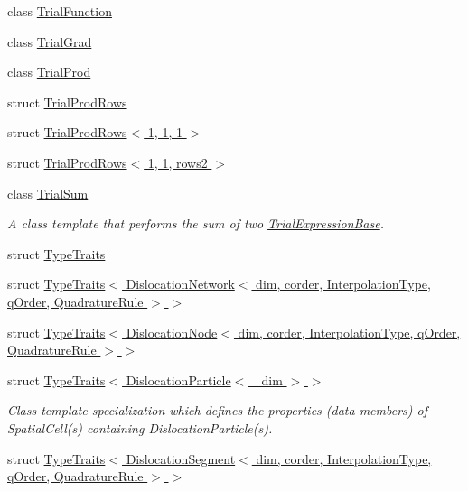 \begin{DoxyCompactItemize}
class \hyperlink{classmodel_1_1_trial_function}{Trial\+Function}
\item 
class \hyperlink{classmodel_1_1_trial_grad}{Trial\+Grad}
\item 
class \hyperlink{classmodel_1_1_trial_prod}{Trial\+Prod}
\item 
struct \hyperlink{structmodel_1_1_trial_prod_rows}{Trial\+Prod\+Rows}
\item 
struct \hyperlink{structmodel_1_1_trial_prod_rows_3_011_00_011_00_011_01_4}{Trial\+Prod\+Rows$<$ 1, 1, 1 $>$}
\item 
struct \hyperlink{structmodel_1_1_trial_prod_rows_3_011_00_011_00_01rows2_01_4}{Trial\+Prod\+Rows$<$ 1, 1, rows2 $>$}
\item 
class \hyperlink{classmodel_1_1_trial_sum}{Trial\+Sum}
\begin{DoxyCompactList}\small\item\em A class template that performs the sum of two \hyperlink{structmodel_1_1_trial_expression_base}{Trial\+Expression\+Base}. \end{DoxyCompactList}\item 
struct \hyperlink{structmodel_1_1_type_traits}{Type\+Traits}
\item 
struct \hyperlink{structmodel_1_1_type_traits_3_01_dislocation_network_3_01dim_00_01corder_00_01_interpolation_typb44c9a0829b0ec93825ce805eb39aeed}{Type\+Traits$<$ Dislocation\+Network$<$ dim, corder, Interpolation\+Type, q\+Order, Quadrature\+Rule $>$ $>$}
\item 
struct \hyperlink{structmodel_1_1_type_traits_3_01_dislocation_node_3_01dim_00_01corder_00_01_interpolation_type_0c5626ad89ae64c98a058e51061d11ac7}{Type\+Traits$<$ Dislocation\+Node$<$ dim, corder, Interpolation\+Type, q\+Order, Quadrature\+Rule $>$ $>$}
\item 
struct \hyperlink{structmodel_1_1_type_traits_3_01_dislocation_particle_3_01__dim_01_4_01_4}{Type\+Traits$<$ Dislocation\+Particle$<$ \+\_\+dim $>$ $>$}
\begin{DoxyCompactList}\small\item\em Class template specialization which defines the properties (data members) of Spatial\+Cell(s) containing Dislocation\+Particle(s). \end{DoxyCompactList}\item 
struct \hyperlink{structmodel_1_1_type_traits_3_01_dislocation_segment_3_01dim_00_01corder_00_01_interpolation_typ757fc2f31a35d5fc1b07a4a1fd7c8dd4}{Type\+Traits$<$ Dislocation\+Segment$<$ dim, corder, Interpolation\+Type, q\+Order, Quadrature\+Rule $>$ $>$}

\end{DoxyCompactItemize}

